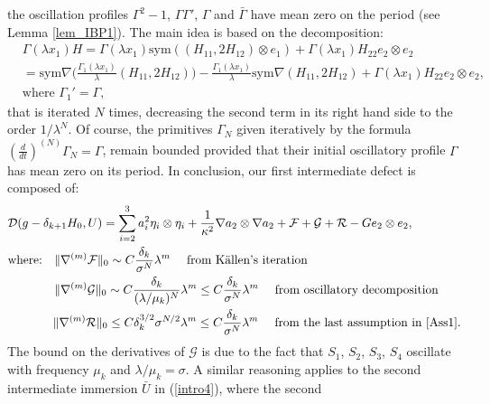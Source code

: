 \documentclass[reqno,twoside,11pt]{amsart}
\newcommand{\sym}{\mathrm{sym}}
\numberwithin{equation}{section}
\theoremstyle{plain}
\theoremstyle{definition}
\begin{document}
the oscillation profiles $\Gamma^2-1$,
$\Gamma\Gamma'$, $\Gamma$ and $\bar\Gamma$ have mean zero on the
period (see Lemma \ref{lem_IBP1}). The main idea
is based on the decomposition: %
\begin{equation}\label{intro55}
\begin{split}
& \Gamma (\lambda x_1) H  = \Gamma(\lambda x_1) \sym ((H_{11},
2H_{12})\otimes e_1) + \Gamma(\lambda x_1) H_{22}e_2\otimes e_2
\\ & = \sym\nabla \Big(\frac{\Gamma_1(\lambda x_1)}{\lambda} (H_{11},
2H_{12})\Big) - \frac{\Gamma_1(\lambda x_1)}{\lambda}\sym\nabla
(H_{11}, 2H_{12})  + \Gamma(\lambda x_1) H_{22}e_2\otimes e_2,
\\ & \mbox{where } \Gamma_1'=\Gamma,
\end{split}
\end{equation}
that is iterated $N$ times, decreasing the second term in its right hand side to
the order $1/\lambda^N$. Of course, the primitives
$\Gamma_N$ given iteratively by the formula $(\frac{d}{dt})^{(N)}\Gamma_N=\Gamma$, remain
bounded provided that their initial oscillatory profile $\Gamma$ has mean zero on its period.
In conclusion, our first intermediate defect is composed of:
\begin{equation}\label{intro6}
\begin{split}
& \mathcal{D}(g-\delta_{k+1}H_0, U)  =\sum_{i=2}^3
  a_{i}^2\eta_i\otimes \eta_i + \frac{1}{\kappa^2}\nabla
  a_{2}\otimes\nabla a_2 + \mathcal{F} +   \mathcal{G} + \mathcal{R}- Ge_2 \otimes e_2,
\\ & \mbox{where:} \quad \|\nabla^{(m)}\mathcal{F}\|_0\sim
C \frac{\delta_k}{\sigma^N} \lambda^m \quad \mbox{ from K\"allen's iteration}\\
& \qquad\quad \;\; \; \|\nabla^{(m)}\mathcal{G}\|_0\sim
C\frac{\delta_k}{(\lambda/\mu_k)^{N}}\lambda^m 
\leq C\frac{\delta_k}{\sigma^{N}}\lambda^m \quad \mbox{ from oscillatory
  decomposition}\\
& \qquad\quad \;\; \, \|\nabla^{(m)}\mathcal{R}\|_0\leq C
\delta_k^{3/2}\sigma^{N/2}\lambda^m\leq C \frac{\delta_k}{\sigma^{N}}\lambda^m
\quad \mbox{ from the last assumption in \ref{Ass1}}.
\end{split}
\end{equation}
The bound on the derivatives of $\mathcal{G}$ is due to the fact that 
$S_1$, $S_2$, $S_3$, $S_4$ oscillate with frequency $\mu_k$ and $\lambda/\mu_k=\sigma$.
A similar reasoning applies to the second
intermediate immersion $\bar U$ in (\ref{intro4}), where the second
\end{document}

